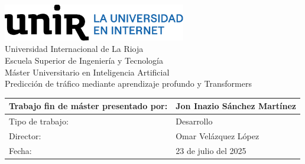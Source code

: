 \begin{titlepage}
	
	
	\centering
	\vspace{3cm}
	\includegraphics[width=0.60\textwidth]{includes/logoUnir.eps}\\	
	{\Huge Universidad Internacional de La Rioja \\}
	{\LARGE Escuela Superior de Ingeniería y Tecnología \\}
	\vspace{3cm}
	\setmainfont{Calibri Light}
	{\Large Máster Universitario en Inteligencia Artificial\\}
	\setmainfont{Calibri}
	{\Huge\textcolor{blueUnir}{Predicción de tráfico mediante aprendizaje profundo y Transformers} \\}
	\vfill{}
	\def\arraystretch{1}
	\setmainfont{Calibri Light}
	\begin{tabular}{| p{8cm} | p{7cm} |}
		\arrayrulecolor{gray80}
		\hline
		Trabajo fin de máster presentado por: & Jon Inazio Sánchez Martínez \\
		\hline
		Tipo de trabajo: & Desarrollo \\
		\hline
		Director: & Omar Velázquez López \\
		\hline
		Fecha: & 23 de julio del 2025 \\
		\hline
	\end{tabular}
\vspace{4cm}
\end{titlepage}